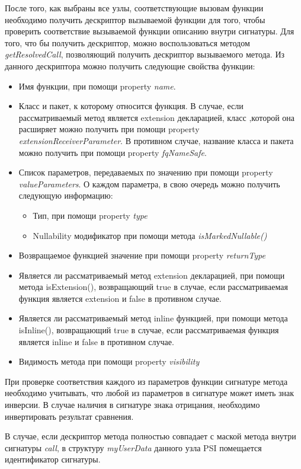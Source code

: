 После того, как выбраны все узлы, соответствующие вызовам функции необходимо
получить дескриптор вызываемой функции для того, чтобы проверить соответствие
вызываемой функции описанию внутри сигнатуры.
Для того, что бы получить дескриптор, можно воспользоваться методом
\textit{getResolvedCall}, позволяющий получить дескриптор вызываемого метода.
Из данного дескриптора можно получить следующие свойства функции:
\begin{itemize}
	\item Имя функции, при помощи property \textit{name}.
	\item Класс и пакет, к которому относится функция.
		  	В случае, если рассматриваемый метод является extension декларацией,
		  	класс ,которой она расширяет можно получить при помощи property
		  	\textit{extensionReceiverParameter}.
		  	В противном случае, название класса и пакета можно получить при помощи
		  	property \textit{fqNameSafe}.
	\item Список параметров, передаваемых по значению при помощи property
		 	  \textit{valueParameters}.
				О каждом параметра, в свою очередь можно получить следующую информацию:
	\begin{itemize}
		\item Тип, при помощи property \textit{type}
		\item Nullability модификатор при помощи метода \textit{isMarkedNullable()}
	\end{itemize}
	\item Возвращаемое функцией значение при помощи property \textit{returnType}
	\item Является ли рассматриваемый метод extension декларацией, при помощи
				метода isExtension(), возвращающий true в случае, если рассматриваемая
				функция является extension и false в противном случае.
	\item Является ли рассматриваемый метод inline функцией, при помощи метода
				isInline(), возвращающий true в случае, если рассматриваемая функция
				является inline и false в противном случае.
	\item Видимость метода при помощи property \textit{visibility}
\end{itemize}
При проверке соответствия каждого из параметров функции сигнатуре метода необходимо учитывать, что любой из параметров в сигнатуре может иметь знак инверсии.
В случае наличия в сигнатуре знака отрицания, необходимо инвертировать результат сравнения.

В случае, если дескриптор метода полностью совпадает с маской метода внутри
сигнатуры \textit{call}, в структуру \textit{myUserData} данного узла PSI
помещается идентификатор сигнатуры.
